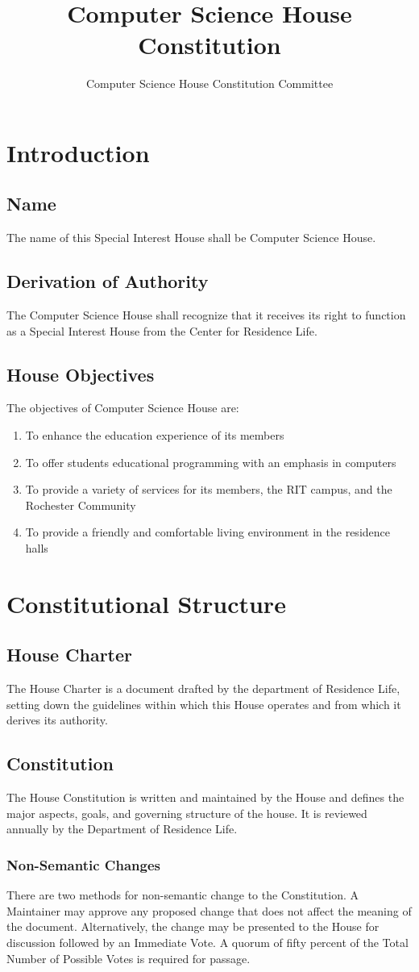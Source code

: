 \documentclass{article}
\title{Computer Science House Constitution}
\author{Computer Science House Constitution Committee}
\date{\datechanged}
\newcommand{\article}[1]{\section{#1} \label{#1}}
\newcommand{\asection}[1]{\subsection{#1} \label{#1}}
\newcommand{\asubsection}[1]{\subsubsection{#1} \label{#1}}
\begin{document}
\maketitle

\tableofcontents

\article{Introduction}

\asection{Name}
The name of this Special Interest House shall be Computer Science House.

\asection{Derivation of Authority}
The Computer Science House shall recognize that it receives its right to function as a Special Interest House from the Center for Residence Life.

\asection{House Objectives}
The objectives of Computer Science House are:
\begin{enumerate}
	\item To enhance the education experience of its members
	\item To offer students educational programming with an emphasis in computers
	\item To provide a variety of services for its members, the RIT campus, and the Rochester Community
	\item To provide a friendly and comfortable living environment in the residence halls
\end{enumerate}

\article{Constitutional Structure}

\asection{House Charter}
The House Charter is a document drafted by the department of Residence Life, setting down the guidelines within which this House operates and from which it derives its authority.

\asection{Constitution}
The House Constitution is written and maintained by the House and defines the major aspects, goals, and governing structure of the house.
It is reviewed annually by the Department of Residence Life.

\asubsection{Non-Semantic Changes}
There are two methods for non-semantic change to the Constitution.
A Maintainer may approve any proposed change that does not affect the meaning of the document.
Alternatively, the change may be presented to the House for discussion followed by an Immediate Vote.
A quorum of fifty percent of the Total Number of Possible Votes is required for passage.
\end{document}
